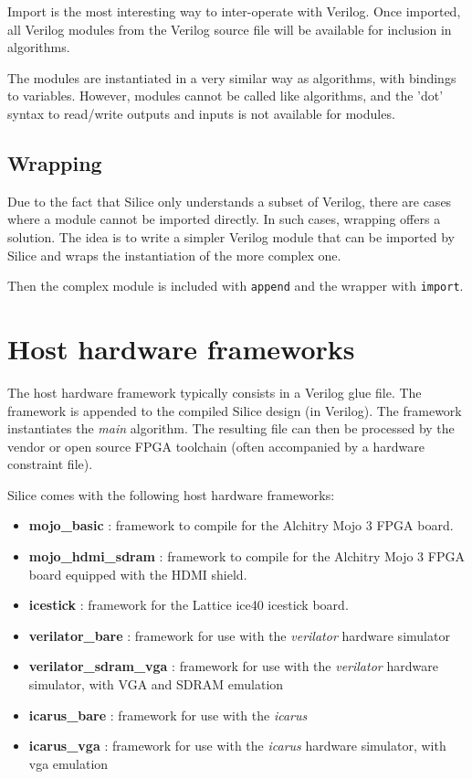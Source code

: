 \documentclass[a4]{article}
\newcommand\todo[1]{{\color{magenta}\textbf{TODO:} #1}}
\newcommand\verilog{Verilog}
\newcommand\silice{Silice}
\begin{document}
Import is the most interesting way to inter-operate with \verilog{}.
Once imported, all \verilog{} modules from the \verilog{} source file 
will be available for inclusion in algorithms.

The modules are instantiated in a very similar way as algorithms, with bindings to variables. However, modules cannot be called like algorithms, and the 'dot' syntax to read/write outputs and inputs is not available for modules.

\subsection{Wrapping}

Due to the fact that \silice{} only understands a subset of \verilog{}, there
are cases where a module cannot be imported directly. In such cases, wrapping
offers a solution. The idea is to write a simpler \verilog{} module that can be imported by \silice{} and wraps the instantiation of the more complex one.

Then the complex module is included with \texttt{append} and the wrapper with \texttt{import}.


\section{Host hardware frameworks}
\label{sec:host}

The host hardware framework typically consists in a \verilog{} glue file. The framework is appended to the compiled \silice{} design (in \verilog{}). The framework instantiates the \textit{main} algorithm. The resulting file can then be processed by the vendor or open source FPGA toolchain (often accompanied by a hardware constraint file).

\silice{} comes with the following host hardware frameworks:
\begin{itemize}
	\item \textbf{mojo\_basic} : framework to compile for the Alchitry Mojo 3 FPGA board.
	\item \textbf{mojo\_hdmi\_sdram} : framework to compile for the Alchitry Mojo 3 FPGA board equipped with the HDMI shield.
	\item \textbf{icestick} : framework for the Lattice ice40 icestick board.
	\item \textbf{verilator\_bare} : framework for use with the \textit{verilator} hardware simulator
	\item \textbf{verilator\_sdram\_vga} : framework for use with the \textit{verilator} hardware simulator, with VGA and SDRAM emulation
	\item \textbf{icarus\_bare} : framework for use with the \textit{icarus}
	\item \textbf{icarus\_vga} : framework for use with the \textit{icarus} hardware simulator, with vga emulation
\end{itemize}
\end{document}
